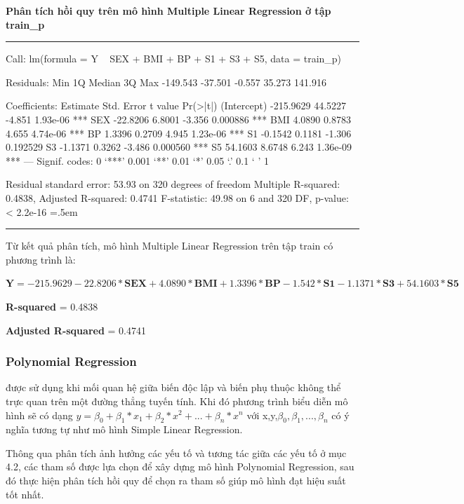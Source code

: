 \documentclass[runningheads]{llncs}
\newenvironment{lcverbatim}
 {\SaveVerbatim{cverb}}
 {\endSaveVerbatim
  \flushleft\fboxrule=0pt\fboxsep=.5em
  \colorbox{cverbbg}{%
    \makebox[\dimexpr\linewidth-2\fboxsep][l]{\BUseVerbatim{cverb}}%
  }
  \endflushleft
}
\begin{document}
\vspace{0.5cm}
\textbf{Phân tích hồi quy trên mô hình Multiple Linear Regression ở tập train\_p}
\vspace{0.5cm}
\hrule
\begin{lcverbatim}
Call:
lm(formula = Y ~ SEX + BMI + BP + S1 + S3 + S5, data = train_p)

Residuals:
     Min       1Q   Median       3Q      Max 
-149.543  -37.501   -0.557   35.273  141.916 

Coefficients:
             Estimate Std. Error t value Pr(>|t|)    
(Intercept) -215.9629    44.5227  -4.851 1.93e-06 ***
SEX          -22.8206     6.8001  -3.356 0.000886 ***
BMI            4.0890     0.8783   4.655 4.74e-06 ***
BP             1.3396     0.2709   4.945 1.23e-06 ***
S1            -0.1542     0.1181  -1.306 0.192529    
S3            -1.1371     0.3262  -3.486 0.000560 ***
S5            54.1603     8.6748   6.243 1.36e-09 ***
---
Signif. codes:  0 ‘***’ 0.001 ‘**’ 0.01 ‘*’ 0.05 ‘.’ 0.1 ‘ ’ 1

Residual standard error: 53.93 on 320 degrees of freedom
Multiple R-squared:  0.4838,	Adjusted R-squared:  0.4741 
F-statistic: 49.98 on 6 and 320 DF,  p-value: < 2.2e-16
\end{lcverbatim}
\hrule
\vspace{0.5cm}

Từ kết quả phân tích, mô hình Multiple Linear Regression trên tập train có phương trình là:
\begin{center}
	$\textbf{Y}=  -215.9629 -22.8206* \textbf{SEX} + 4.0890*\textbf{BMI} +  1.3396*\textbf{BP} -
	1.542*\textbf{S1} -1.1371*\textbf{S3} + 54.1603*\textbf{S5}$
\end{center}

\textbf{R-squared} = 0.4838

\textbf{Adjusted R-squared} = 0.4741

\subsubsection{Polynomial Regression} được sử dụng khi mối quan hệ giữa biến độc lập và biến phụ thuộc không thể trực quan trên một đường thẳng tuyến tính. Khi đó phương trình biểu diễn mô hình sẽ có dạng $y= \beta_0 +\beta_1*x_1+\beta_2*x^2+...+\beta_n*x^n$ với x,y,$\beta_0, \beta_1,...,\beta_n$
có ý nghĩa tương tự như mô hình Simple Linear Regression.

Thông qua phân tích ảnh hưởng các yếu tố và tương tác giữa các yếu tố ở mục 4.2, các tham số được lựa chọn để xây dựng mô hình Polynomial Regression, sau đó thực hiện phân tích hồi quy để chọn ra tham số giúp mô hình đạt hiệu suất tốt nhất. 
\end{document}
